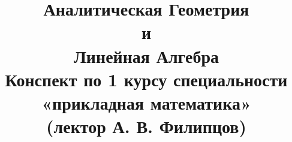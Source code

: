 \begin{titlepage}
\clearpage\thispagestyle{empty}
\title{\textbf{\Huge{Аналитическая Геометрия\\ и\\ Линейная Алгебра}}\\Конспект по 1 курсу специальности «прикладная математика»\\(лектор А. В. Филипцов)}

\date{}
\pagebreak
\end{titlepage}